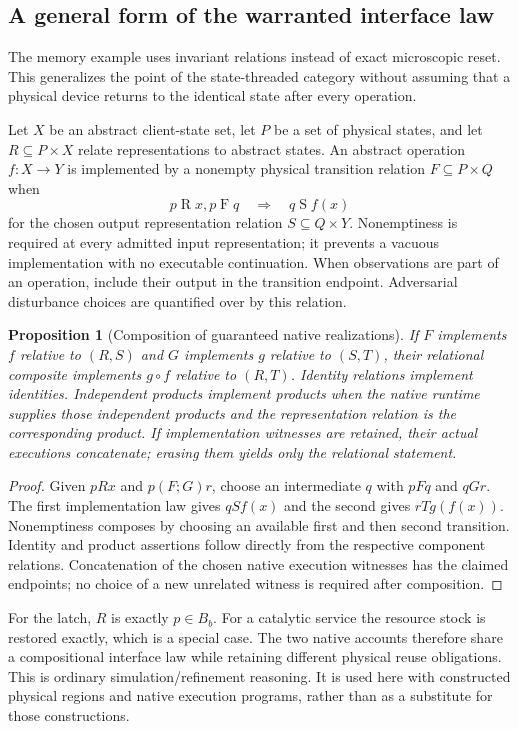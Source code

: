 \documentclass[11pt]{article}
\newtheorem{proposition}[theorem]{Proposition}
\theoremstyle{definition}
\theoremstyle{remark}
\begin{document}
\subsection{A general form of the warranted interface law}
The memory example uses invariant relations instead of exact microscopic
reset. This generalizes the point of the state-threaded category without
assuming that a physical device returns to the identical state after every
operation.

Let $X$ be an abstract client-state set, let $P$ be a set of physical
states, and let $R\subseteq P\times X$ relate representations to abstract
states. An abstract operation $f:X\to Y$ is implemented by a nonempty
physical transition relation $F\subseteq P\times Q$ when
\[
 p\mathrel R x, p\mathrel F q
       \quad\Longrightarrow\quad q\mathrel S f(x)
\]
for the chosen output representation relation $S\subseteq Q\times Y$.
Nonemptiness is required at every admitted input representation; it
prevents a vacuous implementation with no executable continuation.
When observations are part of an operation, include their output in the
transition endpoint. Adversarial disturbance choices are quantified over
by this relation.

\begin{proposition}[Composition of guaranteed native realizations]
\label{prop:simulation-composition}
If $F$ implements $f$ relative to $(R,S)$ and $G$ implements $g$ relative
to $(S,T)$, their relational composite implements $g\circ f$ relative to
$(R,T)$. Identity relations implement identities. Independent products
implement products when the native runtime supplies those independent
products and the representation relation is the corresponding product.
If implementation witnesses are retained, their actual executions
concatenate; erasing them yields only the relational statement.
\end{proposition}
\begin{proof}
Given $pRx$ and $p(F;G)r$, choose an intermediate $q$ with $pFq$ and
$qGr$. The first implementation law gives $qS f(x)$ and the second gives
$rT g(f(x))$. Nonemptiness composes by choosing an available first and
then second transition. Identity and product assertions follow directly
from the respective component relations. Concatenation of the chosen
native execution witnesses has the claimed endpoints; no choice of a
new unrelated witness is required after composition.
\end{proof}

For the latch, $R$ is exactly $p\in B_b$. For a catalytic service the
resource stock is restored exactly, which is a special case. The two
native accounts therefore share a compositional interface law while
retaining different physical reuse obligations. This is ordinary
simulation/refinement reasoning. It is used here with constructed
physical regions and native execution programs, rather than as a
substitute for those constructions.
\end{document}
